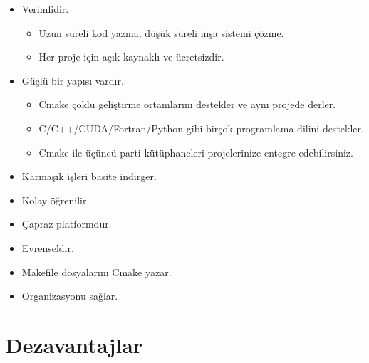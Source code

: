 \documentclass[
]{book}
\providecommand{\tightlist}{%
  \setlength{\itemsep}{0pt}\setlength{\parskip}{0pt}}
\begin{document}
\begin{itemize}
\tightlist
\item
  Verimlidir.

  \begin{itemize}
  \tightlist
  \item
    Uzun süreli kod yazma, düşük süreli inşa sistemi çözme.
  \item
    Her proje için açık kaynaklı ve ücretsizdir.
  \end{itemize}
\item
  Güçlü bir yapısı vardır.

  \begin{itemize}
  \tightlist
  \item
    Cmake çoklu geliştirme ortamlarını destekler ve aynı projede derler.
  \item
    C/C++/CUDA/Fortran/Python gibi birçok programlama dilini destekler.
  \item
    Cmake ile üçüncü parti kütüphaneleri projelerinize entegre edebilirsiniz.
  \end{itemize}
\item
  Karmaşık işleri basite indirger.
\item
  Kolay öğrenilir.
\item
  Çapraz platformdur.
\item
  Evrenseldir.
\item
  Makefile dosyalarını Cmake yazar.
\item
  Organizasyonu sağlar.
\end{itemize}

\hypertarget{dezavantajlar-1}{%
\section*{Dezavantajlar}\label{dezavantajlar-1}}
\end{document}
